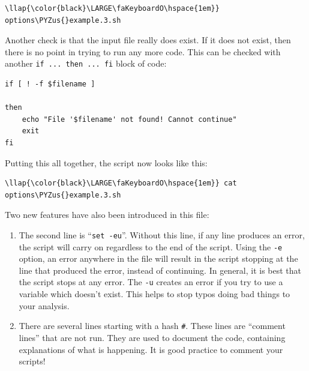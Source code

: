 \documentclass[11pt]{article}
\providecommand{\tightlist}{%
      \setlength{\itemsep}{0pt}\setlength{\parskip}{0pt}}
\def\PYZus{\char`\_}
\begin{document}
\begin{terminalinput}
\begin{Verbatim}[commandchars=\\\{\}]
\llap{\color{black}\LARGE\faKeyboardO\hspace{1em}} options\PYZus{}example.3.sh
\end{Verbatim}
\end{terminalinput}

    Another check is that the input file really does exist. If it does not
exist, then there is no point in trying to run any more code. This can
be checked with another \texttt{if\ ...\ then\ ...\ fi} block of code:

\begin{verbatim}
if [ ! -f $filename ]

then
    echo "File '$filename' not found! Cannot continue"
    exit
fi
\end{verbatim}

Putting this all together, the script now looks like this:

\begin{terminalinput}
\begin{Verbatim}[commandchars=\\\{\}]
\llap{\color{black}\LARGE\faKeyboardO\hspace{1em}} cat options\PYZus{}example.3.sh
\end{Verbatim}
\end{terminalinput}

    Two new features have also been introduced in this file:

\begin{enumerate}
\def\labelenumi{\arabic{enumi}.}
\tightlist
\item
  The second line is ``\texttt{set\ -eu}''. Without this line, if any
  line produces an error, the script will carry on regardless to the end
  of the script. Using the \texttt{-e} option, an error anywhere in the
  file will result in the script stopping at the line that produced the
  error, instead of continuing. In general, it is best that the script
  stops at any error. The \texttt{-u} creates an error if you try to use
  a variable which doesn't exist. This helps to stop typos doing bad
  things to your analysis.
\item
  There are several lines starting with a hash \texttt{\#}. These lines
  are ``comment lines'' that are not run. They are used to document the
  code, containing explanations of what is happening. It is good
  practice to comment your scripts!
\end{enumerate}
\end{document}
